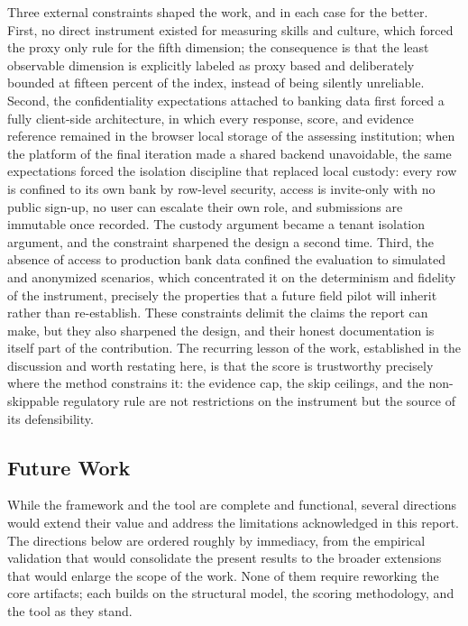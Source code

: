 Three external constraints shaped the work, and in each case for the better. First, no direct instrument existed for measuring skills and culture, which forced the proxy only rule for the fifth dimension; the consequence is that the least observable dimension is explicitly labeled as proxy based and deliberately bounded at fifteen percent of the index, instead of being silently unreliable. Second, the confidentiality expectations attached to banking data first forced a fully client-side architecture, in which every response, score, and evidence reference remained in the browser local storage of the assessing institution; when the platform of the final iteration made a shared backend unavoidable, the same expectations forced the isolation discipline that replaced local custody: every row is confined to its own bank by row-level security, access is invite-only with no public sign-up, no user can escalate their own role, and submissions are immutable once recorded. The custody argument became a tenant isolation argument, and the constraint sharpened the design a second time. Third, the absence of access to production bank data confined the evaluation to simulated and anonymized scenarios, which concentrated it on the determinism and fidelity of the instrument, precisely the properties that a future field pilot will inherit rather than re-establish. These constraints delimit the claims the report can make, but they also sharpened the design, and their honest documentation is itself part of the contribution. The recurring lesson of the work, established in the discussion and worth restating here, is that the score is trustworthy precisely where the method constrains it: the evidence cap, the skip ceilings, and the non-skippable regulatory rule are not restrictions on the instrument but the source of its defensibility.

\subsection{Future Work}

While the framework and the tool are complete and functional, several directions would extend their value and address the limitations acknowledged in this report. The directions below are ordered roughly by immediacy, from the empirical validation that would consolidate the present results to the broader extensions that would enlarge the scope of the work. None of them require reworking the core artifacts; each builds on the structural model, the scoring methodology, and the tool as they stand.

